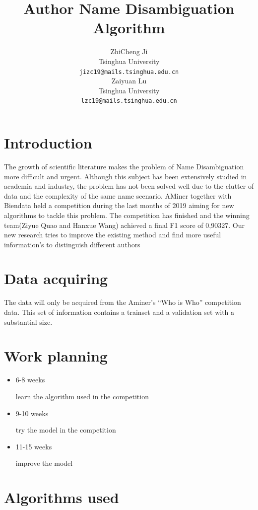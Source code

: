 \documentclass{article}
\title{Author Name Disambiguation Algorithm}
\author{%
 ZhiCheng Ji \\
  Tsinghua University\\
  \texttt{jizc19@mails.tsinghua.edu.cn} \\
  \And
  Zaiyuan Lu \\
  Tsinghua University\\
  \texttt{lzc19@mails.tsinghua.edu.cn}\\
}
\begin{document}
\maketitle

\section{Introduction}

The growth of scientific literature makes the problem of Name Disambiguation more difficult 
and urgent. Although this subject has been extensively studied in academia and industry, 
the problem has not been solved well due to the clutter of data and the complexity of the same name scenario.
AMiner together with Biendata held a competition during the last months of 2019 aiming for 
new algorithms to tackle this problem. The competition has finished and the winning 
team(Ziyue Quao and Hanxue Wang) achieved a final F1 score of 0,90327. Our new research 
tries to improve the existing method and find more useful information’s to distinguish different authors

\section{Data acquiring}

The data will only be acquired from the Aminer’s “Who is Who” competition data. 
This set of information contains a trainset and a validation set with a substantial size. 

\section{Work planning}

\begin{itemize}
     \item 6-8 weeks
     
     learn the algorithm used in the competition

     \item 9-10 weeks
     
     try the model in the competition
     
     \item 11-15 weeks
     
     improve the model

\end{itemize}

\section{Algorithms used}
\end{document}
